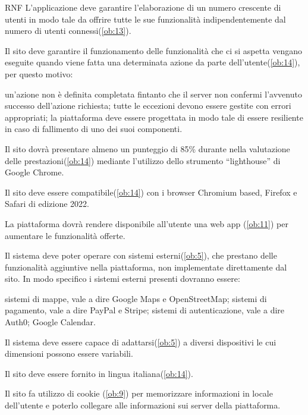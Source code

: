 \begin{listaPersonale}{RNF}
     L'applicazione deve garantire l'elaborazione di un numero crescente di utenti in modo tale da offrire tutte le sue funzionalità indipendentemente dal numero di utenti connessi(\ref{ob:13}).

     Il sito deve garantire il funzionamento delle funzionalità che ci si aspetta vengano eseguite quando viene fatta una determinata azione da parte dell'utente(\ref{ob:14}), per questo motivo:
    \begin{listaPersonale2}{}
         un'azione non è definita completata fintanto che il server non confermi l'avvenuto successo dell'azione richiesta;
         tutte le eccezioni devono essere gestite con errori appropriati;
         la piattaforma deve essere progettata in modo tale di essere resiliente in caso di fallimento di uno dei suoi componenti.
    \end{listaPersonale2}

     Il sito dovrà presentare almeno un punteggio di 85\% durante nella valutazione delle prestazioni(\ref{ob:14}) mediante l'utilizzo dello strumento “lighthouse” di Google Chrome.

     Il sito deve essere compatibile(\ref{ob:14}) con i browser Chromium based, Firefox e Safari di edizione 2022.

     La piattaforma dovrà rendere disponibile all'utente una web app (\ref{ob:11}) per aumentare le funzionalità offerte.

     Il sistema deve poter operare con sistemi esterni(\ref{ob:5}), che prestano delle funzionalità aggiuntive nella piattaforma, non implementate direttamente dal sito. In modo specifico i sistemi esterni presenti dovranno essere:
    \begin{listaPersonale2}{}
         sistemi di mappe, vale a dire Google Maps e OpenStreetMap;
         sistemi di pagamento, vale a dire PayPal e Stripe;
         sistemi di autenticazione, vale a dire Auth0; %
         Google Calendar.
    \end{listaPersonale2}

     Il sistema deve essere capace di adattarsi(\ref{ob:5}) a diversi dispositivi le cui dimensioni possono essere variabili.

     Il sito deve essere fornito in lingua italiana(\ref{ob:14}).

     Il sito fa utilizzo di cookie (\ref{ob:9}) per memorizzare informazioni in locale dell'utente e poterlo collegare alle informazioni sui server della piattaforma.
\end{listaPersonale}